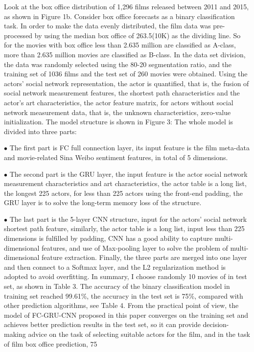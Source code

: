 \documentclass[review]{cvpr}
\begin{document}
Look at the box office distribution of 1,296 films released between 2011 and 2015, as shown in Figure 1b.
Consider box office forecasts as a binary classification task. In order to make the data evenly distributed, the film data was pre-processed by using the median box office of 263.5(10K) as the dividing line.
So for the movies with box office less than 2.635 million are classified as A-class, more than 2.635 million movies are classified as B-class.
In the data set division, the data was randomly selected using the 80-20 segmentation ratio, and the training set of 1036 films and the test set of 260 movies were obtained.
Using the actors' social network representation, the actor is quantified, that is, the fusion of social network measurement features, the shortest path characteristics and the actor's art characteristics, the actor feature matrix,
for actors without social network measurement data, that is, the unknown characteristics, zero-value initialization. The model structure is shown in Figure 3:
The whole model is divided into three parts:
\par$\bullet$ The first part is FC full connection layer, its input feature is the film meta-data and movie-related Sina Weibo sentiment features, in total of 5 dimensions.
\par$\bullet$ The second part is the GRU layer, the input feature is the actor social network measurement characteristics and art characteristics, the actor table is a long list,
the longest 225 actors, for less than 225 actors using the front-end padding, the GRU layer is to solve the long-term memory loss of the structure.
\par$\bullet$ The last part is the 5-layer CNN structure, input for the actors' social network shortest path feature, similarly, the actor table is a long list,
input less than 225 dimensions is fulfilled by padding, CNN has a good ability to capture multi-dimensional features, and use of Max-pooling layer to solve the problem of multi-dimensional feature extraction.
Finally, the three parts are merged into one layer and then connect to a Softmax layer, and the L2 regularization method is adopted to avoid overfitting.
In summary, I choose randomly 10 movies of in test set, as shown in Table 3. The accuracy of the binary classification model in training set reached 99.61\%, the accuracy in the test set is 75\%, compared with other prediction algorithms, see Table 4.
From the practical point of view, the model of FC-GRU-CNN proposed in this paper converges on the training set and achieves better prediction results in the test set, so it can provide decision-making advice on the task of selecting suitable actors for the film, and in the task of film box office prediction, 75%
\end{document}
